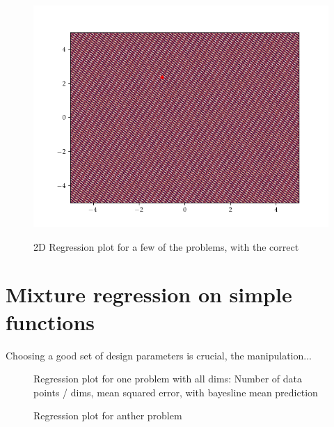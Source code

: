 \begin{figure}[h]
    \begin{minipage}[b]{0.49\textwidth}
      \includegraphics[trim=1.2cm 0.7cm 2cm 1cm,clip,width=\textwidth]{Figures/coco/f23.png}
     \end{minipage}
     \hfill
  \label{f1_reg_2D}
\end{figure}



\begin{figure}[h]
  \caption{2D Regression plot for a few of the problems, with the correct }
\end{figure}

\section{Mixture regression on simple functions}
Choosing a good set of design parameters is crucial, 
the manipulation... 

\begin{figure}[h]
    \caption{Regression plot for one problem with all dims: Number of data points / dims, mean squared error, with bayesline mean prediction}
\end{figure}

\begin{figure}[h]
    \caption{Regression plot for anther problem}
\end{figure}

